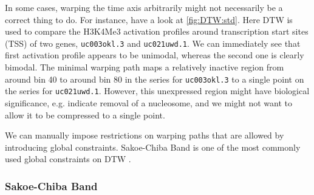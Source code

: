 \documentclass[parskip]{cs4rep}
\newcommand{\gene}[1]{{\tt #1}}
\newcommand{\histonemodification}[1]{#1}
\begin{document}
In some cases, warping the time axis arbitrarily might not necessarily be a correct thing to do.
For instance, have a look at \autoref{fig:DTW:std}. Here DTW is used to compare the \histonemodification{H3K4Me3} activation profiles around transcription start sites (TSS) of two genes, \gene{uc003okl.3} and \gene{uc021uwd.1}. We can immediately see that first activation profile appears to be unimodal, whereas the second one is clearly bimodal. The minimal warping path maps a relatively inactive region from around bin 40 to around bin 80 in the series for \gene{uc003okl.3} to a single point on the series for \gene{uc021uwd.1}. However, this unexpressed region might have biological significance, e.g. indicate removal of a nucleosome, and we might not want to allow it to be compressed to a single point. 

We can manually impose restrictions on warping paths that are allowed by introducing global constraints. Sakoe-Chiba Band is one of the most commonly used global constraints on DTW \citep{Ratanamahatana:2004wu}. 

\subsubsection{Sakoe-Chiba Band}
\end{document}
